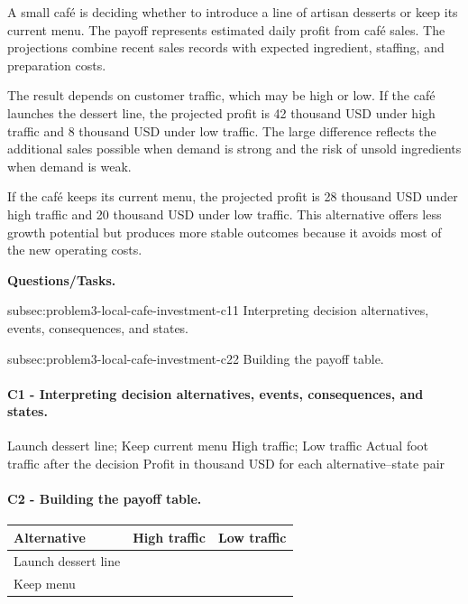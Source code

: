 	A small café is deciding whether to introduce a line of artisan desserts or keep its current menu. The payoff represents estimated daily profit from café sales. The projections combine recent sales records with expected ingredient, staffing, and preparation costs.
	
	The result depends on customer traffic, which may be high or low. If the café launches the dessert line, the projected profit is 42 thousand USD under high traffic and 8 thousand USD under low traffic. The large difference reflects the additional sales possible when demand is strong and the risk of unsold ingredients when demand is weak.
	
	If the café keeps its current menu, the projected profit is 28 thousand USD under high traffic and 20 thousand USD under low traffic. This alternative offers less growth potential but produces more stable outcomes because it avoids most of the new operating costs.

	\textbf{Questions/Tasks.}
	\begin{enumerate}
		\CriterionTask
		{subsec:problem3-local-cafe-investment-c1}{1}
		{Interpreting decision alternatives, events, consequences, and states.}

		\CriterionTask
		{subsec:problem3-local-cafe-investment-c2}{2}
		{Building the payoff table.}
	\end{enumerate}

\paragraph*{C1 - Interpreting decision alternatives, events, consequences, and states.}
	\label{subsec:problem3-local-cafe-investment-c1}

	\DecisionElementsTable
	{Launch dessert line; Keep current menu}
	{High traffic; Low traffic}
	{Actual foot traffic after the decision}
	{Profit in thousand USD for each alternative--state pair}


\paragraph*{C2 - Building the payoff table.}
	\label{subsec:problem3-local-cafe-investment-c2}
	\begin{center}
		\begin{tabular}{lll}
			\toprule
			Alternative & High traffic & Low traffic \\
			\midrule
			Launch dessert line & \GTenToneHL{payoff}{42} & \GTenToneHL{payoff}{8} \\
			Keep menu & \GTenToneHL{payoff}{28} & \GTenToneHL{payoff}{20} \\
			\bottomrule
		\end{tabular}
	\end{center}

